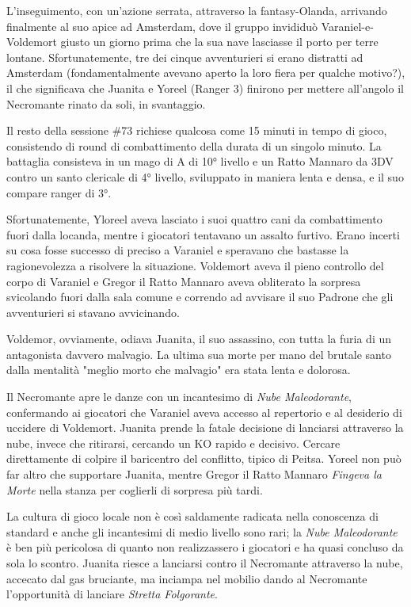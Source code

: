 L'inseguimento, con un'azione serrata, attraverso la fantasy-Olanda, arrivando finalmente al suo apice ad Amsterdam, dove il gruppo invididuò Varaniel-e-Voldemort giusto un giorno prima che la sua nave lasciasse il porto per terre lontane. Sfortunatemente, tre dei cinque avventurieri si erano distratti ad Amsterdam (fondamentalmente avevano aperto la loro fiera per qualche motivo?), il che significava che Juanita e Yoreel (Ranger 3) finirono per mettere all'angolo il Necromante rinato da soli, in svantaggio.


Il resto della sessione \#73 richiese qualcosa come 15 minuti in tempo di gioco, consistendo di round di combattimento della durata di un singolo minuto. La battaglia consisteva in un mago di A\dnd{} di 10° livello e un Ratto Mannaro da 3DV contro un santo clericale di 4° livello, sviluppato in maniera lenta e densa, e il suo compare ranger di 3°.

Sfortunatemente, Yloreel aveva lasciato i suoi quattro cani da combattimento fuori dalla locanda, mentre i giocatori tentavano un assalto furtivo. Erano incerti su cosa fosse successo di preciso a Varaniel e speravano che bastasse la ragionevolezza a risolvere la situazione. Voldemort aveva il pieno controllo del corpo di Varaniel e Gregor il Ratto Mannaro aveva obliterato la sorpresa svicolando fuori dalla sala comune e correndo ad avvisare il suo Padrone che gli avventurieri si stavano avvicinando.

Voldemor, ovviamente, odiava Juanita, il suo assassino, con tutta la furia di un antagonista davvero malvagio. La ultima sua morte per mano del brutale santo dalla mentalità "meglio morto che malvagio" era stata lenta e dolorosa.

Il Necromante apre le danze con un incantesimo di \textit{Nube Maleodorante}, confermando ai giocatori che Varaniel aveva accesso al repertorio e al desiderio di uccidere di Voldemort. Juanita prende la fatale decisione di lanciarsi attraverso la nube, invece che ritirarsi, cercando un KO rapido e decisivo. Cercare direttamente di colpire il baricentro del conflitto, tipico di Peitsa. Yoreel non può far altro che supportare Juanita, mentre Gregor il Ratto Mannaro \textit{Fingeva la Morte} nella stanza per coglierli di sorpresa più tardi.

La cultura di gioco locale non è così saldamente radicata nella conoscenza di \dnd{} standard e anche gli incantesimi di medio livello sono rari; la \textit{Nube Maleodorante} è ben più pericolosa di quanto non realizzassero i giocatori e ha quasi concluso da sola lo scontro. Juanita riesce a lanciarsi contro il Necromante attraverso la nube, accecato dal gas bruciante, ma inciampa nel mobilio dando al Necromante l'opportunità di lanciare \textit{Stretta Folgorante}.


